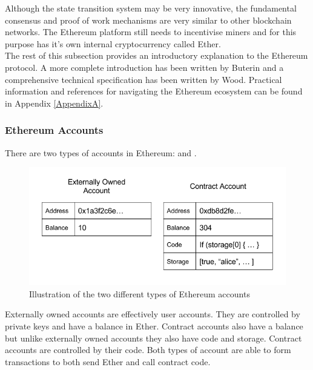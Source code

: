 Although the state transition system may be very innovative, the fundamental consensus and proof of work mechanisms are very similar to other blockchain networks. The Ethereum platform still needs to incentivise miners and for this purpose has it's own internal cryptocurrency called Ether. \\

The rest of this subsection provides an introductory explanation to the Ethereum protocol. A more complete introduction has been written by Buterin\cite{Ethereum} and a comprehensive technical specification has been written by Wood\cite{wood2014ethereum}. Practical information and references for navigating the Ethereum ecosystem can be found in Appendix \ref{AppendixA}. \\

\subsubsection{Ethereum Accounts}
There are two types of accounts in Ethereum:  and . \\

\begin{figure}
\centering
\includegraphics[width=\textwidth]{Figures/ethereum_accounts}
\decoRule
\caption[Ethereum Accounts]{Illustration of the two different types of Ethereum accounts}
\label{fig:ethereum_accounts}
\end{figure}

Externally owned accounts are effectively user accounts. They are controlled by private keys and have a balance in Ether. Contract accounts also have a balance but unlike externally owned accounts they also have code and storage. Contract accounts are controlled by their code. Both types of account are able to form transactions to both send Ether and call contract code.\\

